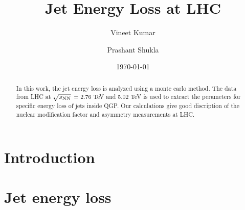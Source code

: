 \documentclass[reprint,amsmath,amssymb,aps,showpacs,showkeys]{revtex4}
\begin{document}
\newcommand{\fm}{\mbox{fm}}
\newcommand{\MeV}{\mbox{MeV}}
\newcommand{\GeV}{\mbox{GeV}}
\newcommand{\pt}{\ensuremath{p_{T}}\xspace}
\newcommand{\pta}{\ensuremath{p_{T1}}\xspace}
\newcommand{\ptb}{\ensuremath{p_{T2}}\xspace}

\title{Jet Energy Loss at LHC}



\author{Vineet Kumar}

\author{Prashant Shukla}

\date{\today}



\begin{abstract}
  In this work, the jet energy loss is analyzed using a monte carlo method.
  The data from LHC at $\sqrt{s_{\rm NN}}$ = 2.76 TeV and 5.02 TeV is used to extract
  the perameters for specific energy loss of jets inside QGP. Our calculations give
  good discription of the nuclear modification factor and asymmetry measurements at
  LHC.
\end{abstract}


\maketitle

\section{Introduction}
\label{Sec:Introduction}




\section{Jet energy loss}
\label{Sec:JetEnergyLoss}
\end{document}
